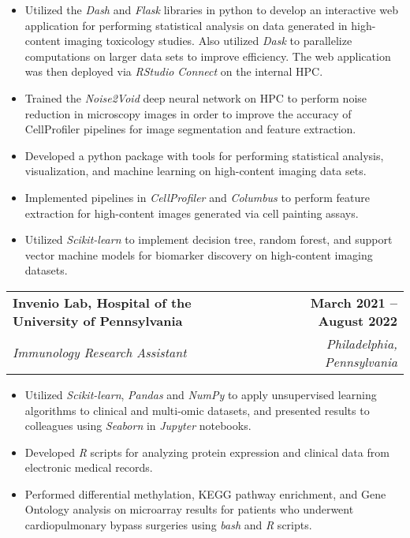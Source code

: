 \documentclass[letterpaper,11pt]{article}
\makeatletter
\newcommand{\resumeItem}[1]{
  \item\small{
    {#1 \vspace{-2pt}}
  }
}
\newcommand{\resumeSubheading}[4]{
  \vspace{-2pt}\item
    \begin{tabular*}{1.0\textwidth}[t]{l@{\extracolsep{\fill}}r}
      \textbf{#1} & \textbf{\small #2} \\
      \textit{\small#3} & \textit{\small #4} \\
    \end{tabular*}\vspace{-7pt}
}
\newcommand{\resumeItemListStart}{\begin{itemize}}
\newcommand{\resumeItemListEnd}{\end{itemize}\vspace{-5pt}}
\makeatother
\begin{document}
    \vspace{-5pt}
    \resumeItemListStart
        \resumeItem{
            Utilized the \textit{Dash} and \textit{Flask} libraries in python to develop 
            an interactive web application for performing statistical analysis on data 
            generated in high-content imaging toxicology studies. Also utilized 
            \textit{Dask} to parallelize computations on larger data sets to improve 
            efficiency. The web application was then deployed via \textit{RStudio Connect} 
            on the internal HPC.
        }
        \resumeItem{
            Trained the \textit{Noise2Void} deep neural network on HPC to perform noise 
            reduction in microscopy images in order to improve the accuracy of CellProfiler
            pipelines for image segmentation and feature extraction.
        }
        \resumeItem{
            Developed a python package with tools for performing statistical analysis, 
            visualization, and machine learning on high-content imaging data sets.
        }
        \resumeItem{
            Implemented pipelines in \textit{CellProfiler} and \textit{Columbus} to 
            perform feature extraction for high-content images generated via cell painting 
            assays.
        }
        \resumeItem{
            Utilized \textit{Scikit-learn} to implement decision tree, random forest, and 
            support vector machine models for biomarker discovery on high-content imaging 
            datasets.
        }
    \resumeItemListEnd
  
\resumeSubheading
    {Invenio Lab, Hospital of the University of Pennsylvania}
    {March 2021 -- August 2022}
    {Immunology Research Assistant}
    {Philadelphia, Pennsylvania}

    \vspace{-5pt}
    \resumeItemListStart
        \resumeItem{
            Utilized \emph{Scikit-learn}, \emph{Pandas} and \emph{NumPy} to apply 
            unsupervised learning algorithms to clinical and multi-omic datasets, and 
            presented results to colleagues using \emph{Seaborn} in \emph{Jupyter} 
            notebooks.
        }
        \resumeItem{
            Developed \emph{R} scripts for analyzing protein expression and clinical data 
            from electronic medical records.
        }
        \resumeItem{
            Performed differential methylation, KEGG pathway enrichment, and Gene Ontology 
            analysis on microarray results for patients who underwent cardiopulmonary 
            bypass surgeries using \emph{bash} and \emph{R} scripts.
        }
    \resumeItemListEnd
  
\end{document}
